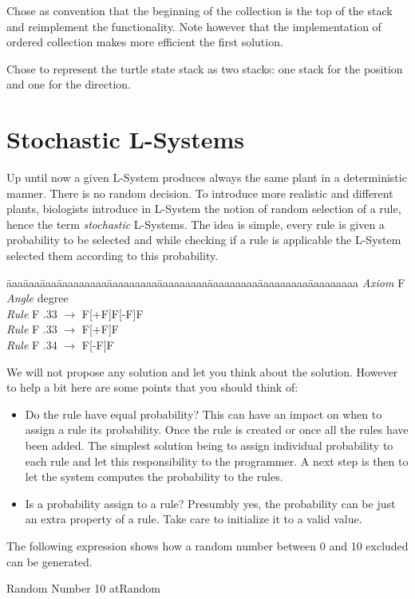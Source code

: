 \begin{exonofig} Chose as convention that the beginning of the collection is
the top of the stack and reimplement the functionality. Note however
that the implementation of ordered collection makes more efficient the
first solution.
\end{exonofig}

\begin{exonofig}Chose to represent the turtle state stack as two stacks: one stack for the position and one for the direction.
\end{exonofig}


\section{Stochastic L-Systems}
Up until now a given L-System produces always the same plant in a
deterministic manner. There is no random decision. To introduce more
realistic and different plants, biologists introduce in L-System the
notion of random selection of a rule, hence the term \emph{stochastic}
L-Systems. The idea is simple, every rule is given a probability to be
selected and while checking if a rule is applicable the L-System
selected them according to this probability.

\begin{tabbing}
\=aaa\=aaa\=aaa\=aaaaaaaaa\=aaaaaaaaa\=aaaaaaaaa\=aaaaaaaaa\=aaaaaaaaa\=aaaaaaaaa\kill
\>\>\>\> \emph{Axiom} \>\>F\\
\>\>\>\> \emph{Angle} \> degree\\
\>\>\>\> \emph{Rule}  \>\>F .33 $\rightarrow$ F[+F]F[-F]F\\
\>\>\>\> \emph{Rule}  \>\>F .33 $\rightarrow$ F[+F]F\\
\>\>\>\> \emph{Rule}  \>\>F .34 $\rightarrow$ F[-F]F
\end{tabbing}


We will not propose any solution and let you think about the solution. 
However to help a bit here are some points that you should think of: 
\begin{itemize}
\item Do the rule have equal probability? This can have an impact on when to assign a rule 
its probability. Once the rule is created or once all the rules have
been added. The simplest solution being to assign individual
probability to each rule and let this responsibility to the
programmer. A next step is then to let the system computes the
probability to the rules.

\item Is a probability assign to a rule? Presumbly yes, the probability can be just an 
extra property of a rule. Take care to initialize it to a valid value. 
\end{itemize}

The following expression shows how a random number between 0 and 10
excluded can be generated.
\begin{scriptwithtitle}{Random Number}
10 atRandom
\end{scriptwithtitle}


\ifx\wholebook\relax\else\fi
